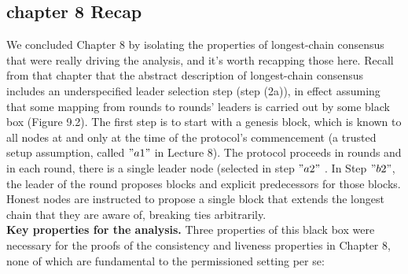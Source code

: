 \subsection{chapter 8 Recap}
We concluded Chapter 8 by isolating the properties of longest-chain consensus that were
really driving the analysis, and it’s worth recapping those here. Recall from that chapter
that the abstract description of longest-chain consensus includes an underspecified leader
selection step (step (2a)), in effect assuming that some mapping from rounds to rounds’
leaders is carried out by some black box (Figure 9.2). The first step is to start with a genesis block, which is known to all nodes at and only at the time of the
protocol’s commencement (a trusted setup assumption, called $"a1"$ in Lecture 8). The protocol proceeds in
rounds and in each round, there is a single leader node (selected in step $"a2"$ . In Step $"b2"$, the leader of the
round proposes blocks and explicit predecessors for those blocks. Honest nodes are instructed to propose a
single block that extends the longest chain that they are aware of, breaking ties arbitrarily.\\

\noindent
\textbf{Key properties for the analysis.} Three properties of this black box were necessary for
the proofs of the consistency and liveness properties in Chapter 8, none of which are
fundamental to the permissioned setting per se:
\\

